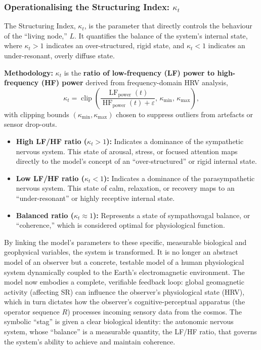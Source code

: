 \documentclass{article}
\begin{document}
\subsubsection{Operationalising the Structuring Index: $\kappa_t$}

The Structuring Index, $\kappa_t$, is the parameter that directly controls the behaviour of the ``living node,'' $L$. It quantifies the balance of the system's internal state, where $\kappa_t>1$ indicates an over-structured, rigid state, and $\kappa_t<1$ indicates an under-resonant, overly diffuse state.

\textbf{Methodology:} $\kappa_t$ is the \textbf{ratio of low-frequency (LF) power to high-frequency (HF) power} derived from frequency-domain HRV analysis,
\begin{equation}
    \kappa_t = \operatorname{clip}\!\left(\frac{\operatorname{LF}_{\text{power}}(t)}{\operatorname{HF}_{\text{power}}(t) + \varepsilon},\,\kappa_{\min},\,\kappa_{\max}\right),
\end{equation}
with clipping bounds $(\kappa_{\min},\kappa_{\max})$ chosen to suppress outliers from artefacts or sensor drop-outs.

\begin{itemize}
    \item \textbf{High LF/HF ratio ($\kappa_t > 1$):} Indicates a dominance of the sympathetic nervous system. This state of arousal, stress, or focused attention maps directly to the model's concept of an ``over-structured'' or rigid internal state.
    \item \textbf{Low LF/HF ratio ($\kappa_t < 1$):} Indicates a dominance of the parasympathetic nervous system. This state of calm, relaxation, or recovery maps to an ``under-resonant'' or highly receptive internal state.
    \item \textbf{Balanced ratio ($\kappa_t \approx 1$):} Represents a state of sympathovagal balance, or ``coherence,'' which is considered optimal for physiological function.
\end{itemize}

By linking the model's parameters to these specific, measurable biological and geophysical variables, the system is transformed. It is no longer an abstract model of an observer but a concrete, testable model of a human physiological system dynamically coupled to the Earth's electromagnetic environment. The model now embodies a complete, verifiable feedback loop: global geomagnetic activity (affecting SR) can influence the observer's physiological state (HRV), which in turn dictates how the observer's cognitive-perceptual apparatus (the operator sequence $R$) processes incoming sensory data from the cosmos. The symbolic ``stag'' is given a clear biological identity: the autonomic nervous system, whose ``balance'' is a measurable quantity, the LF/HF ratio, that governs the system's ability to achieve and maintain coherence.
\end{document}

